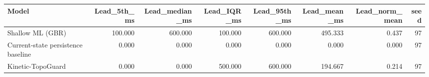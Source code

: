 \begin{tabular}{lrrrrrrr}
\toprule
Model & Lead\_5th\_ms & Lead\_median\_ms & Lead\_IQR\_ms & Lead\_95th\_ms & Lead\_mean\_ms & Lead\_norm\_mean & seed \\
\midrule
Shallow ML (GBR) & 100.000 & 600.000 & 100.000 & 600.000 & 495.333 & 0.437 & 97 \\
Current-state persistence baseline & 0.000 & 0.000 & 0.000 & 0.000 & 0.000 & 0.000 & 97 \\
Kinetic-TopoGuard & 0.000 & 0.000 & 500.000 & 600.000 & 194.667 & 0.214 & 97 \\
\bottomrule
\end{tabular}